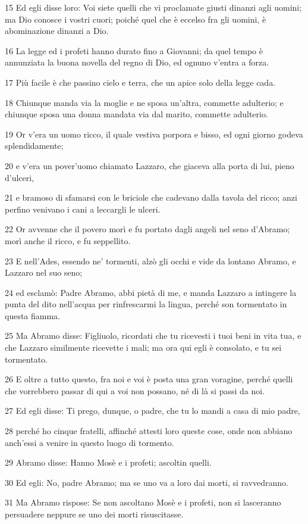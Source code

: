 \par 15 Ed egli disse loro: Voi siete quelli che vi proclamate giusti dinanzi agli uomini; ma Dio conosce i vostri cuori; poiché quel che è eccelso fra gli uomini, è abominazione dinanzi a Dio.
\par 16 La legge ed i profeti hanno durato fino a Giovanni; da quel tempo è annunziata la buona novella del regno di Dio, ed ognuno v'entra a forza.
\par 17 Più facile è che passino cielo e terra, che un apice solo della legge cada.
\par 18 Chiunque manda via la moglie e ne sposa un'altra, commette adulterio; e chiunque sposa una donna mandata via dal marito, commette adulterio.
\par 19 Or v'era un uomo ricco, il quale vestiva porpora e bisso, ed ogni giorno godeva splendidamente;
\par 20 e v'era un pover'uomo chiamato Lazzaro, che giaceva alla porta di lui, pieno d'ulceri,
\par 21 e bramoso di sfamarsi con le briciole che cadevano dalla tavola del ricco; anzi perfino venivano i cani a leccargli le ulceri.
\par 22 Or avvenne che il povero morì e fu portato dagli angeli nel seno d'Abramo; morì anche il ricco, e fu seppellito.
\par 23 E nell'Ades, essendo ne' tormenti, alzò gli occhi e vide da lontano Abramo, e Lazzaro nel suo seno;
\par 24 ed esclamò: Padre Abramo, abbi pietà di me, e manda Lazzaro a intingere la punta del dito nell'acqua per rinfrescarmi la lingua, perché son tormentato in questa fiamma.
\par 25 Ma Abramo disse: Figliuolo, ricordati che tu ricevesti i tuoi beni in vita tua, e che Lazzaro similmente ricevette i mali; ma ora qui egli è consolato, e tu sei tormentato.
\par 26 E oltre a tutto questo, fra noi e voi è posta una gran voragine, perché quelli che vorrebbero passar di qui a voi non possano, né di là si passi da noi.
\par 27 Ed egli disse: Ti prego, dunque, o padre, che tu lo mandi a casa di mio padre,
\par 28 perché ho cinque fratelli, affinché attesti loro queste cose, onde non abbiano anch'essi a venire in questo luogo di tormento.
\par 29 Abramo disse: Hanno Mosè e i profeti; ascoltin quelli.
\par 30 Ed egli: No, padre Abramo; ma se uno va a loro dai morti, si ravvedranno.
\par 31 Ma Abramo rispose: Se non ascoltano Mosè e i profeti, non si lasceranno persuadere neppure se uno dei morti risuscitasse.

